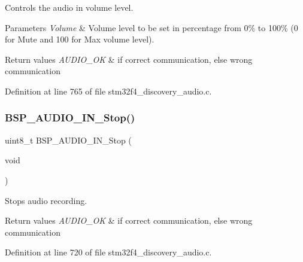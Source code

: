 Controls the audio in volume level. 


\begin{DoxyParams}{Parameters}
{\em Volume} & Volume level to be set in percentage from 0\% to 100\% (0 for Mute and 100 for Max volume level). \\
\hline
\end{DoxyParams}

\begin{DoxyRetVals}{Return values}
{\em A\+U\+D\+I\+O\+\_\+\+OK} & if correct communication, else wrong communication \\
\hline
\end{DoxyRetVals}


Definition at line 765 of file stm32f4\+\_\+discovery\+\_\+audio.\+c.

\mbox{\label{group___s_t_m32_f4___d_i_s_c_o_v_e_r_y___a_u_d_i_o___i_n___exported___functions_ga71122b966773b01c8a5933c76f3f12fe}} 
\subsubsection{\texorpdfstring{B\+S\+P\+\_\+\+A\+U\+D\+I\+O\+\_\+\+I\+N\+\_\+\+Stop()}{BSP\_AUDIO\_IN\_Stop()}}
{\footnotesize\ttfamily uint8\+\_\+t B\+S\+P\+\_\+\+A\+U\+D\+I\+O\+\_\+\+I\+N\+\_\+\+Stop (\begin{DoxyParamCaption}\item[{void}]{ }\end{DoxyParamCaption})}



Stops audio recording. 


\begin{DoxyRetVals}{Return values}
{\em A\+U\+D\+I\+O\+\_\+\+OK} & if correct communication, else wrong communication \\
\hline
\end{DoxyRetVals}


Definition at line 720 of file stm32f4\+\_\+discovery\+\_\+audio.\+c.

